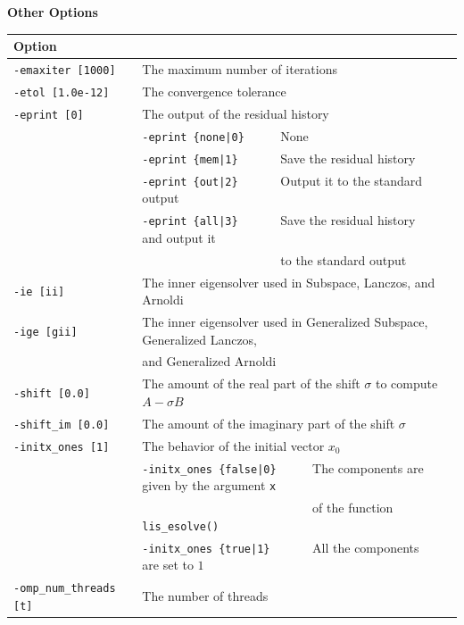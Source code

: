 \documentclass[a4paper]{article}
\begin{document}
\\ \\
\begin{minipage}[t]{\textwidth}
\begin{center}
{\bf Other Options}\\
\begin{tabular}{l|ll}\hline\hline
Option &                          \\ \hline
\verb=-emaxiter [1000]= & The maximum number of iterations         \\ 
\verb=-etol [1.0e-12]=  & The convergence tolerance          \\
\verb=-eprint [0]=      & The output of the residual history                \\
                       & \verb=-eprint {none|0}     =  None \\
                       & \verb=-eprint {mem|1}      =  Save the residual history\\
                       & \verb=-eprint {out|2}      =  Output it to the standard output\\
                       & \verb=-eprint {all|3}      =  Save the residual history and output it \\
                       & \verb=                     =  to the standard output\\
\verb=-ie [ii]= & The inner eigensolver used in Subspace, Lanczos, and Arnoldi\\
\verb=-ige [gii]= & The inner eigensolver used in Generalized Subspace, Generalized Lanczos, \\
                       & and Generalized Arnoldi\\
\verb=-shift [0.0]= & The amount of the real part of the shift $\sigma$ to compute $A-\sigma B$ \\
\verb=-shift_im [0.0]= & The amount of the imaginary part of the shift $\sigma$ \\
\verb=-initx_ones [1]= & The behavior of the initial vector $x_{0}$  \\
                       & \verb=-initx_ones {false|0}     =  The components are given by the argument \verb=x= \\
                       & \verb=                          =  of the function \verb=lis_esolve()= \\
                       & \verb=-initx_ones {true|1}      =  All the components are set to $1$ \\
\verb=-omp_num_threads [t]= & The number of threads        \\ 

\end{tabular}
\end{center}
\end{minipage}
\end{document}
